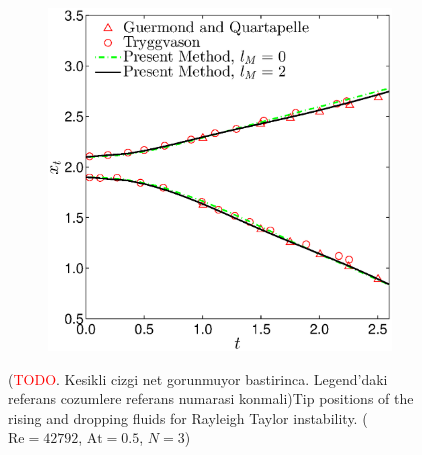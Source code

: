 \documentclass[11pt,a4paper,twoside]{article}
\begin{document}
	\begin{figure}[ht!]
		\begin{center}
			\begin{subfigure}[]{0.35\textwidth}
				\includegraphics[width=\textwidth]{RayleighTaylorTipPosition.eps}
			\end{subfigure}
		\end{center}
		\caption{(\textcolor{red}{TODO}. Kesikli cizgi net gorunmuyor bastirinca. Legend'daki referans cozumlere referans numarasi konmali)Tip positions of the rising and dropping fluids for Rayleigh Taylor instability. ($ \text{Re} = 42792 $,  $ \text{At} = 0.5 $, $ N=3 $)}
		\label{Fig:RayleighTaylorComparasion}
	\end{figure}
	
\end{document}
